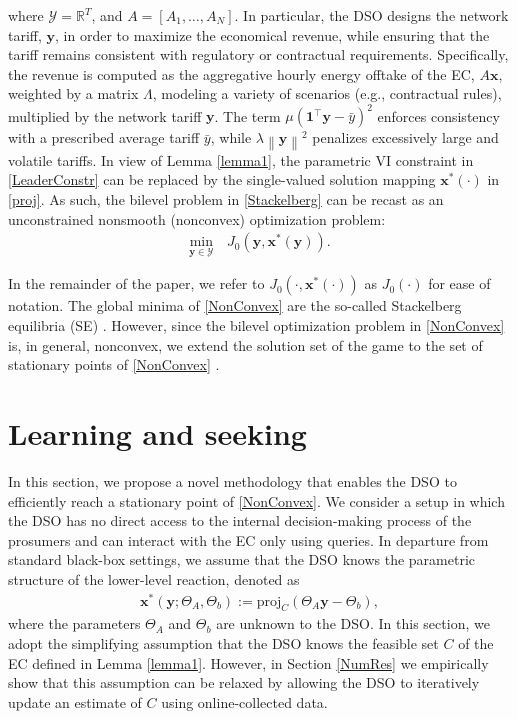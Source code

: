 \documentclass[letterpaper, 10 pt, conference]{ieeeconf}
\newcommand{\real}{\mathbb{R}}
\newcommand\xbf{\mathbf{x}}
\newcommand\ybf{\mathbf{y}}
\begin{document}
where $\mathcal{Y}=\real^T$, and $A=\left[A_1, \dots, A_N\right]$. In particular, the DSO designs the network tariff, $\ybf$, in order to maximize the economical revenue, while ensuring that the tariff remains consistent with regulatory or contractual requirements. Specifically, the revenue is computed as the aggregative hourly energy offtake of the EC, $A \xbf$, weighted by a matrix $\Lambda$, modeling a variety of scenarios (e.g., contractual rules), multiplied by the network tariff $\ybf$. The term $\mu\left(\mathbf{1}^\top\ybf-\bar{y}\right)^2$ enforces consistency with a prescribed average tariff $\bar{y}$, while $\lambda \left\|\ybf\right\|^2$ penalizes excessively large and volatile tariffs.   
In view of Lemma \ref{lemma1}, the parametric VI constraint in \eqref{LeaderConstr} can be replaced by the single-valued solution mapping $\xbf^*(\cdot)$ in \eqref{proj}. As such, the bilevel problem in \eqref{Stackelberg} can be recast as an unconstrained nonsmooth (nonconvex) optimization problem:
\begin{align}\label{NonConvex}
\underset{\ybf \in \mathcal{Y}} {\min} &\, J_0(\ybf, \xbf^*(\ybf)). 
\end{align}

In the remainder of the paper, we refer to $J_0(\cdot,\xbf^*(\cdot))$ as $J_0(\cdot)$ for ease of notation. 
The global minima of \eqref{NonConvex} are the so-called Stackelberg equilibria (SE) \cite{dempe2002foundations}. However, since the bilevel optimization problem in \eqref{NonConvex} is, in general, nonconvex, we extend the solution set of the game to the set of stationary points of \eqref{NonConvex} \cite{grontas2024big, maheshwari2024follower}. 
 
\section{Learning and seeking}\label{Methodology}
In this section, we propose a novel methodology that enables the DSO to efficiently reach a stationary point of \eqref{NonConvex}. We consider a setup in which the DSO has no direct access to the internal decision-making process of the prosumers and can interact with the EC only using queries. In departure from standard black-box settings, we assume that the DSO knows the parametric structure of the lower-level reaction, denoted as
\begin{align}\label{Param}
\xbf^*(\ybf; \Theta_A, \Theta_b):=\mathrm{proj}_C(\Theta_A \ybf-\Theta_b),
\end{align}
where the parameters $\Theta_A$ and $\Theta_b$ are unknown to the DSO. In this section, we adopt the simplifying assumption that the DSO knows the feasible set $C$ of the EC defined in Lemma \ref{lemma1}. %
However, in Section \ref{NumRes} we empirically show that this assumption can be relaxed by allowing the DSO to iteratively update an estimate of $C$ using online-collected data.
\end{document}

